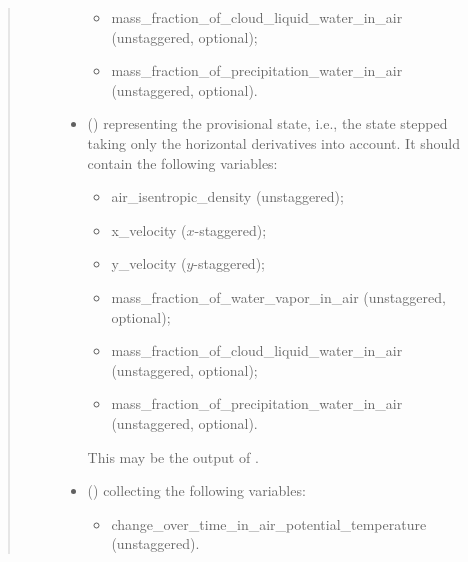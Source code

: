 \documentclass[letterpaper,10pt,english]{sphinxmanual}
\begin{document}
\begin{fulllineitems}
\begin{fulllineitems}
\begin{quote}
\begin{description}
\begin{itemize}
\begin{itemize}
\item {} 
mass\_fraction\_of\_cloud\_liquid\_water\_in\_air (unstaggered, optional);

\item {} 
mass\_fraction\_of\_precipitation\_water\_in\_air (unstaggered, optional).

\end{itemize}


\item {} 
 () \textendash{} 
{\hyperref[\detokenize{api:tasmania.storages.state_isentropic.StateIsentropic}]{}} representing the provisional state, i.e.,
the state stepped taking only the horizontal derivatives into account.
It should contain the following variables:
\begin{itemize}
\item {} 
air\_isentropic\_density (unstaggered);

\item {} 
x\_velocity (\(x\)-staggered);

\item {} 
y\_velocity (\(y\)-staggered);

\item {} 
mass\_fraction\_of\_water\_vapor\_in\_air (unstaggered, optional);

\item {} 
mass\_fraction\_of\_cloud\_liquid\_water\_in\_air (unstaggered, optional);

\item {} 
mass\_fraction\_of\_precipitation\_water\_in\_air (unstaggered, optional).

\end{itemize}

This may be the output of
{\hyperref[\detokenize{api:tasmania.dycore.prognostic_isentropic_nonconservative.PrognosticIsentropicNonconservative.step_neglecting_vertical_advection}]{}}.


\item {} 
 () \textendash{} 
{\hyperref[\detokenize{api:tasmania.storages.grid_data.GridData}]{}} collecting the following variables:
\begin{itemize}
\item {} 
change\_over\_time\_in\_air\_potential\_temperature (unstaggered).


\end{itemize}
\end{itemize}
\end{description}
\end{quote}
\end{fulllineitems}
\end{fulllineitems}
\end{document}
